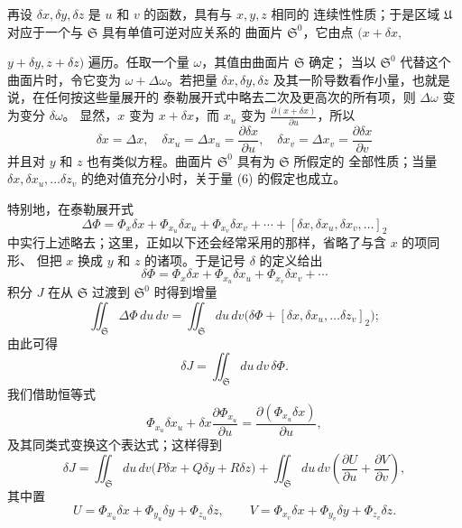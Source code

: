 \documentclass[11pt,a4paper,leqno]{article}
\begin{document}
再设 $\delta x,\delta y,\delta z$ 是 $u$ 和 $v$ 的函数，具有与 $x,y,z$ 相同的
连续性性质；于是区域 $\mathfrak{U}$ 对应于一个与 $\mathfrak{S}$ 具有单值可逆对应关系的
曲面片 $\mathfrak{S}^0$，它由点 $(x+\delta x,$

$y+\delta y,z+\delta z)$ 遍历。任取一个量 $\omega$，其值由曲面片 $\mathfrak{S}$ 确定；
当以 $\mathfrak{S}^0$ 代替这个曲面片时，令它变为 $\omega+\Delta\omega$。若把量
$\delta x,\delta y,\delta z$ 及其一阶导数看作小量，也就是说，在任何按这些量展开的
泰勒展开式中略去二次及更高次的所有项，则 $\Delta\omega$ 变为变分 $\delta\omega$。
显然，$x$ 变为 $x+\delta x$，而 $x_u$ 变为
$\frac{\partial(x+\delta x)}{\partial u}$，所以
\[
\delta x=\Delta x,\quad
\delta x_u=\Delta x_u=\frac{\partial\delta x}{\partial u},\quad
\delta x_v=\Delta x_v=\frac{\partial\delta x}{\partial v}
\]
并且对 $y$ 和 $z$ 也有类似方程。曲面片 $\mathfrak{S}^0$ 具有为 $\mathfrak{S}$ 所假定的
全部性质；当量 $\delta x,\delta x_u,\ldots\delta z_v$ 的绝对值充分小时，关于量 (6)
的假定也成立。

特别地，在泰勒展开式
\[
\Delta\Phi=\Phi_x\delta x+\Phi_{x_u}\delta x_u+\Phi_{x_v}\delta x_v
+\cdots+[\delta x,\delta x_u,\delta x_v,\ldots]_2
\]
中实行上述略去；这里，正如以下还会经常采用的那样，省略了与含 $x$ 的项同形、
但把 $x$ 换成 $y$ 和 $z$ 的诸项。于是记号 $\delta$ 的定义给出
\[
\delta\Phi=\Phi_x\delta x+\Phi_{x_u}\delta x_u+\Phi_{x_v}\delta x_v+\cdots
\]
积分 $J$ 在从 $\mathfrak{S}$ 过渡到 $\mathfrak{S}^0$ 时得到增量
\[
\iint_{\mathfrak{S}}\Delta\Phi\,du\,dv
=\iint_{\mathfrak{S}}du\,dv
\bigl(\delta\Phi+[\delta x,\delta x_u,\ldots\delta z_v]_2\bigr);
\]
由此可得
\[
\delta J=\iint_{\mathfrak{S}}du\,dv\,\delta\Phi.
\]
我们借助恒等式
\[
\Phi_{x_u}\delta x_u
+\delta x\frac{\partial\Phi_{x_u}}{\partial u}
=\frac{\partial(\Phi_{x_u}\delta x)}{\partial u},
\]
及其同类式变换这个表达式；这样得到
\[
\delta J=\iint_{\mathfrak{S}}du\,dv
\bigl(P\delta x+Q\delta y+R\delta z\bigr)
+\iint_{\mathfrak{S}}du\,dv
\left(\frac{\partial U}{\partial u}+\frac{\partial V}{\partial v}\right),
\]
其中置
\[
U=\Phi_{x_u}\delta x+\Phi_{y_u}\delta y+\Phi_{z_u}\delta z,
\qquad
V=\Phi_{x_v}\delta x+\Phi_{y_v}\delta y+\Phi_{z_v}\delta z.
\]
\end{document}
